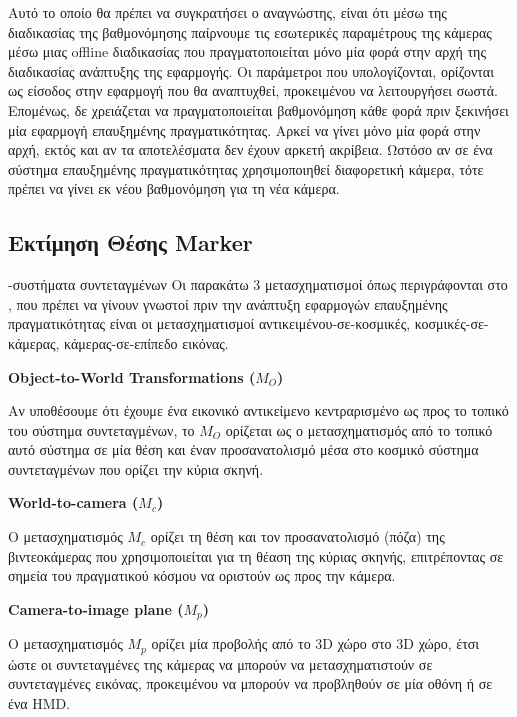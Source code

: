Αυτό το οποίο θα πρέπει να συγκρατήσει ο αναγνώστης, είναι ότι μέσω της διαδικασίας της βαθμονόμησης παίρνουμε τις εσωτερικές παραμέτρους της κάμερας μέσω μιας offline διαδικασίας που πραγματοποιείται μόνο μία φορά στην αρχή της διαδικασίας ανάπτυξης της εφαρμογής. Οι παράμετροι που υπολογίζονται, ορίζονται ως είσοδος στην εφαρμογή που θα αναπτυχθεί, προκειμένου να λειτουργήσει σωστά. Επομένως, δε χρειάζεται να πραγματοποιείται βαθμονόμηση κάθε φορά πριν ξεκινήσει μία εφαρμογή επαυξημένης πραγματικότητας. Αρκεί να γίνει μόνο μία φορά στην αρχή, εκτός και αν τα αποτελέσματα δεν έχουν αρκετή ακρίβεια. Ωστόσο αν σε ένα σύστημα επαυξημένης πραγματικότητας χρησιμοποιηθεί διαφορετική κάμερα, τότε πρέπει να γίνει εκ νέου βαθμονόμηση για τη νέα κάμερα.












\subsection{Εκτίμηση Θέσης Marker}


-συστήματα συντεταγμένων
Οι παρακάτω 3 μετασχηματισμοί όπως περιγράφονται στο \cite{Vallino1998}, που πρέπει να γίνουν γνωστοί πριν την ανάπτυξη εφαρμογών επαυξημένης πραγματικότητας είναι οι μετασχηματισμοί αντικειμένου-σε-κοσμικές, κοσμικές-σε-κάμερας, κάμερας-σε-επίπεδο εικόνας. 

\textbf{Object-to-World Transformations ($M_{O}$)}

Αν υποθέσουμε ότι έχουμε ένα εικονικό αντικείμενο κεντραρισμένο ως προς το τοπικό του σύστημα συντεταγμένων, το $M_{O}$ ορίζεται ως ο μετασχηματισμός από το τοπικό αυτό σύστημα σε μία θέση και έναν προσανατολισμό μέσα στο κοσμικό σύστημα συντεταγμένων που ορίζει την κύρια σκηνή.

\textbf{World-to-camera ($M_{c}$)}

Ο μετασχηματισμός $M_{c}$ ορίζει τη θέση και τον προσανατολισμό (πόζα) της βιντεοκάμερας που χρησιμοποιείται για τη θέαση της κύριας σκηνής, επιτρέποντας σε σημεία του πραγματικού κόσμου να οριστούν ως προς την κάμερα.

\textbf{Camera-to-image plane ($M_{p}$)}

Ο μετασχηματισμός $M_{p}$ ορίζει μία προβολής από το 3D χώρο στο 3D χώρο, έτσι ώστε οι συντεταγμένες της κάμερας να μπορούν να μετασχηματιστούν σε συντεταγμένες εικόνας, προκειμένου να μπορούν να προβληθούν σε μία οθόνη ή σε ένα HMD.


